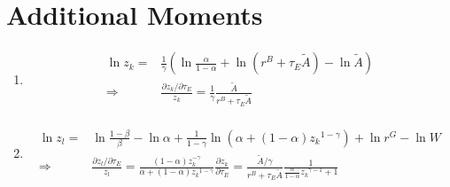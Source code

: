 \documentclass[12pt]{article} %
\begin{document}
\section*{Additional Moments}
\begin{enumerate}
    \item 
    \begin{equation*}
        \begin{split}
            \ln z_k =& \frac{1}{\gamma} (
            \ln \frac{\alpha}{1-\alpha} + \ln ({r^B + \tau_E\tilde{A}}) - \ln {\tilde{A}} )\\
            \Rightarrow & \frac{\partial z_k/\partial \tau_E }{z_k} = \frac{1}{\gamma} \frac{\tilde{A}}{r^B + \tau_E\tilde{A}}\\
        \end{split}
    \end{equation*}
    \item 
    \begin{equation*}
        \begin{split}
            \ln z_l =& \ln \frac{1-\beta}{\beta} - \ln {\alpha} + \frac{1}{1-\gamma} \ln (\alpha + (1-\alpha) {{z_k}}^{1-\gamma}) + \ln r^G - \ln W\\
            \Rightarrow & \frac{\partial z_l/\partial \tau_E }{z_l} =  \frac{(1-\alpha)z_k^{-\gamma}}{\alpha + (1-\alpha) {{z_k}}^{1-\gamma}}\frac{\partial z_k}{\partial \tau_E} = \frac{\tilde{A}/\gamma}{r^B + \tau_E\tilde{A}}\frac{1}{\frac{\alpha}{1-\alpha}{{z_k}}^{\gamma-1} + 1}
        \end{split}
    \end{equation*}
    

\end{enumerate}
\end{document}

